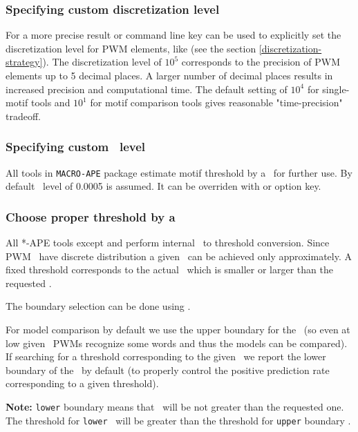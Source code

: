 \subsubsection{Specifying custom discretization level}
For a more precise result  or  command line key can be used to explicitly set
the discretization level for PWM elements, like  (see the section \ref{discretization-strategy}).
The discretization level of $10^5$ corresponds to the precision of PWM elements up to 5 decimal places.
A larger number of decimal places results in increased precision and computational time.
The default setting of $10^4$ for single-motif tools and $10^1$ for motif comparison tools gives reasonable "time-precision" tradeoff.

\subsubsection{Specifying custom \pvalue\ level}
All tools in \texttt{MACRO-APE} package estimate motif threshold by a \pvalue\ for further use. By default \pvalue\ level of 0.0005 is assumed.
It can be overriden with  or  option key.

\subsubsection{Choose proper threshold by a \pvalue}
All *-APE tools except  and  perform internal \pvalue\ to threshold conversion.
Since PWM \pvalues\ have discrete distribution a given \pvalue\ can be achieved only approximately.
A fixed threshold corresponds to the actual \pvalue\ which is smaller or larger than the requested \pvalue.

The boundary selection can be done using .

For model comparison by default we use the upper boundary for the \pvalue~(so even at low given \pvalues\ PWMs recognize some words and thus the models can be 
compared). If searching for a threshold corresponding to the given \pvalue\ we report the lower boundary of the \pvalue\ by default (to properly control
the positive prediction rate corresponding to a given threshold).

\textbf{Note:} \texttt{lower} boundary means that \pvalue\ will be not greater than the requested one.
The threshold for \texttt{lower} \pvalue\ will be greater than the threshold for \texttt{upper} boundary \pvalue.


